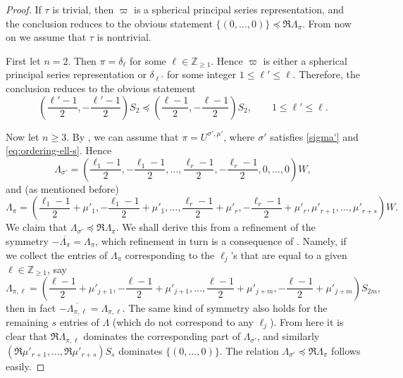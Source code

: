 \documentclass[11pt,oneside]{amsart}
\numberwithin{equation}{section}
\theoremstyle{remark}
\theoremstyle{plain}
\newcommand\ZZ{\mathbb{Z}}
\newcommand\ov{\overline}
\renewcommand\leq{\leqslant}
\renewcommand\geq{\geqslant}
\begin{document}
\begin{proof} If $\tau$ is trivial, then $\varpi$ is a spherical principal series representation, and the conclusion reduces to the obvious statement $\{(0,\dotsc,0)\}\preceq\Re\Lambda_{\pi}$. From now on we assume that $\tau$ is nontrivial.

First let $n=2$. Then $\pi=\delta_\ell$ for some $\ell\in\ZZ_{\geq 1}$. Hence $\varpi$ is either a spherical principal series representation or $\delta_{\ell'}$ for some integer $1\leq\ell'\leq\ell$. Therefore, the conclusion reduces to the obvious statement
\[\left(\frac{\ell'-1}{2},-\frac{\ell'-1}{2}\right)S_2\preceq\left(\frac{\ell-1}{2},-\frac{\ell-1}{2}\right)S_2,\qquad 1\leq\ell'\leq\ell.\]

Now let $n\geq 3$. By \cite[Th.~14.10.20]{GH}, we can assume that $\pi=U^{\sigma',\mu'}$, where $\sigma'$ satisfies \eqref{sigma'} and \eqref{eq:ordering-ell-s}. Hence
\begin{equation}\label{Lambdasigma'}
\Lambda_{\sigma'} = \left(\frac{\ell_1-1}{2},-\frac{\ell_1-1}{2},\dotsc,\frac{\ell_{r}-1}{2},-\frac{\ell_{r}-1}{2},
0,\dotsc,0\right)W,
\end{equation}
and (as mentioned before)
\[
\Lambda_{\pi} = \left(\frac{\ell_1-1}{2}+\mu'_1,-\frac{\ell_1-1}{2}+\mu'_1,\dotsc,\frac{\ell_r-1}{2}+\mu'_r,-\frac{\ell_r-1}{2}+\mu'_r,\mu'_{r+1},\dotsc,\mu'_{r+s}\right)W.
\]
We claim that $\Lambda_{\sigma'}\preceq\Re\Lambda_{\pi}$. We shall derive this from a refinement of the symmetry $-\ov{\Lambda_{\pi}}=\Lambda_{\pi}$, which refinement in turn is a consequence of \cite[Th.~14.10.20]{GH}. Namely, if we collect the entries of $\Lambda_\pi$ corresponding to the $\ell_j$'s that are equal to a given $\ell\in\ZZ_{\geq 1}$, say
\[\Lambda_{\pi,\ell}=\left(\frac{\ell-1}{2}+\mu'_{j+1},-\frac{\ell-1}{2}+\mu'_{j+1},\dotsc,\frac{\ell-1}{2}+\mu'_{j+m},-\frac{\ell-1}{2}+\mu'_{j+m}\right)S_{2m},\]
then in fact $-\ov{\Lambda_{\pi,\ell}}=\Lambda_{\pi,\ell}$. The same kind of symmetry also holds for the remaining $s$ entries of $\Lambda$ (which do not correspond to any $\ell_j$). From here it is clear that $\Re\Lambda_{\pi,\ell}$ dominates the corresponding part of $\Lambda_{\sigma'}$, and similarly $(\Re\mu'_{r+1},\dotsc,\Re\mu'_{r+s})S_s$ dominates $\{(0,\dotsc,0)\}$. The relation $\Lambda_{\sigma'}\preceq\Re\Lambda_{\pi}$ follows easily.


\end{proof}
\end{document}
